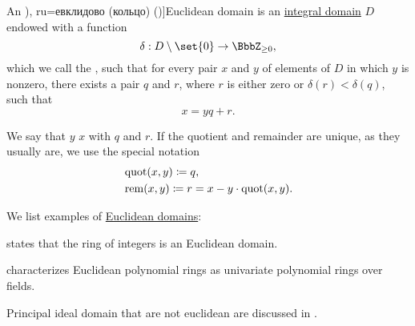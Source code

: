 \begin{definition}\label{def:euclidean_domain}
  An \term[bg=евклидова (област) (\cite[def. VI.2]{ГеновМиховскиМоллов1991}), ru=евклидово (кольцо) (\cite[def. 3.5.2]{Винберг2014})]{Euclidean domain} is an \hyperref[def:integral_domain]{integral domain} \( D \) endowed with a function
  \begin{equation*}
    \delta: D \setminus \set{ 0 } \to \BbbZ_{\geq 0},
  \end{equation*}
  which we call the , such that for every pair \( x \) and \( y \) of elements of \( D \) in which \( y \) is nonzero, there exists a pair \( q \) and \( r \), where \( r \) is either zero or \( \delta(r) < \delta(q) \), such that
  \begin{equation}\label{eq:def:euclidean_domain/division}
    x = yq + r.
  \end{equation}

  We say that \( y \)  \( x \) with  \( q \) and  \( r \). If the quotient and remainder are unique, as they usually are, we use the special notation
  \begin{align*}
    &\operatorname{quot}(x, y) \coloneqq q, \\
    &\operatorname{rem}(x, y) \coloneqq r = x - y \cdot \operatorname{quot}(x, y).
  \end{align*}
\end{definition}

\begin{example}\label{ex:def:euclidean_domain}
  We list examples of \hyperref[def:euclidean_domain]{Euclidean domains}:
  \begin{thmenum}
      states that the ring of integers is an Euclidean domain.

      characterizes Euclidean polynomial rings as univariate polynomial rings over fields.

     Principal ideal domain that are not euclidean are discussed in \cite{Anderson1988}.
  \end{thmenum}
\end{example}

